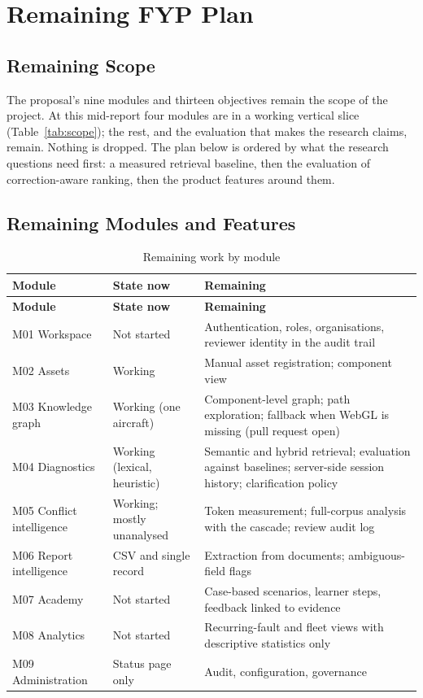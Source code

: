 \chapter{Remaining FYP Plan}\label{ch:remaining}

\section{Remaining Scope}
The proposal's nine modules and thirteen objectives remain the scope of the project. At this mid-report four modules are in a working vertical slice (Table~\ref{tab:scope}); the rest, and the evaluation that makes the research claims, remain. Nothing is dropped. The plan below is ordered by what the research questions need first: a measured retrieval baseline, then the evaluation of correction-aware ranking, then the product features around them.

\section{Remaining Modules and Features}
\begin{longtable}{p{}p{}p{}}
\caption{Remaining work by module}\label{tab:remmods}\\
\toprule \textbf{Module} & \textbf{State now} & \textbf{Remaining} \\ \midrule \endfirsthead
\toprule \textbf{Module} & \textbf{State now} & \textbf{Remaining} \\ \midrule \endhead
M01 Workspace & Not started & Authentication, roles, organisations, reviewer identity in the audit trail \\
M02 Assets & Working & Manual asset registration; component view \\
M03 Knowledge graph & Working (one aircraft) & Component-level graph; path exploration; fallback when WebGL is missing (pull request open) \\
M04 Diagnostics & Working (lexical, heuristic) & Semantic and hybrid retrieval; evaluation against baselines; server-side session history; clarification policy \\
M05 Conflict intelligence & Working; mostly unanalysed & Token measurement; full-corpus analysis with the cascade; review audit log \\
M06 Report intelligence & CSV and single record & Extraction from documents; ambiguous-field flags \\
M07 Academy & Not started & Case-based scenarios, learner steps, feedback linked to evidence \\
M08 Analytics & Not started & Recurring-fault and fleet views with descriptive statistics only \\
M09 Administration & Status page only & Audit, configuration, governance \\
\bottomrule
\end{longtable}

